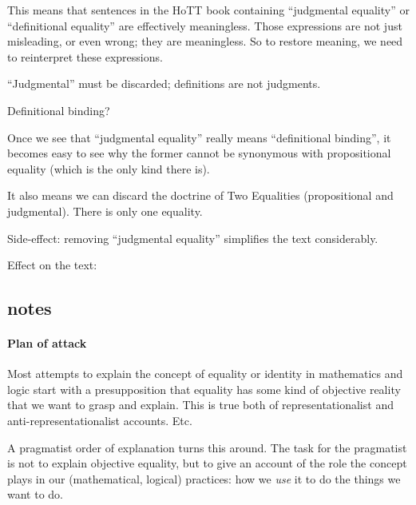 This means that sentences in the HoTT book containing ``judgmental
equality'' or ``definitional equality'' are effectively meaningless.
Those expressions are not just misleading, or even wrong; they are
meaningless. So to restore meaning, we need to reinterpret these
expressions.

``Judgmental'' must be discarded; definitions are not judgments.

Definitional binding?

Once we see that ``judgmental equality'' really means ``definitional
binding'', it becomes easy to see why the former cannot be synonymous
with propositional equality (which is the only kind there is).

It also means we can discard the doctrine of Two Equalities
(propositional and judgmental). There is only one equality.

Side-effect: removing ``judgmental equality'' simplifies the text
considerably.

Effect on the text:


\subsection{notes}

\paragraph{Plan of attack \\}

Most attempts to explain the concept of equality or identity in
mathematics and logic start with a presupposition that equality has
some kind of objective reality that we want to grasp and explain. This
is true both of representationalist and anti-representationalist
accounts.  Etc.

A pragmatist order of explanation turns this around. The task for the
pragmatist is not to explain objective equality, but to give an
account of the role the concept plays in our (mathematical, logical)
practices: how we \textit{use} it to do the things we want to do.


